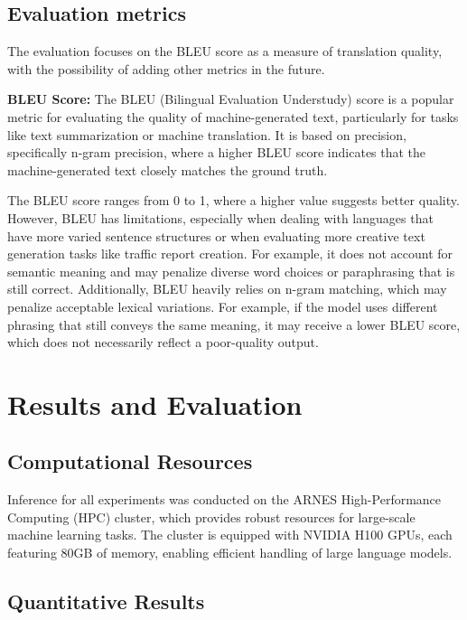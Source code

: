 \documentclass[fleqn,moreauthors,10pt]{ds_report}
\begin{document}
\subsection*{Evaluation metrics}

The evaluation focuses on the BLEU score as a measure of translation quality, with the possibility of adding other metrics in the future.

\noindent \textbf{BLEU Score:} The BLEU (Bilingual Evaluation Understudy) score is a popular metric for evaluating the quality of machine-generated text, particularly for tasks like text summarization or machine translation. It is based on precision, specifically n-gram precision, where a higher BLEU score indicates that the machine-generated text closely matches the ground truth.

The BLEU score ranges from 0 to 1, where a higher value suggests better quality. However, BLEU has limitations, especially when dealing with languages that have more varied sentence structures or when evaluating more creative text generation tasks like traffic report creation. For example, it does not account for semantic meaning and may penalize diverse word choices or paraphrasing that is still correct. Additionally, BLEU heavily relies on n-gram matching, which may penalize acceptable lexical variations. For example, if the model uses different phrasing that still conveys the same meaning, it may receive a lower BLEU score, which does not necessarily reflect a poor-quality output.


\section{Results and Evaluation}

\subsection*{Computational Resources}

Inference for all experiments was conducted on the ARNES High-Performance Computing (HPC) cluster, which provides robust resources for large-scale machine learning tasks. The cluster is equipped with NVIDIA H100 GPUs, each featuring 80GB of memory, enabling efficient handling of large language models.

\subsection*{Quantitative Results}
\end{document}
